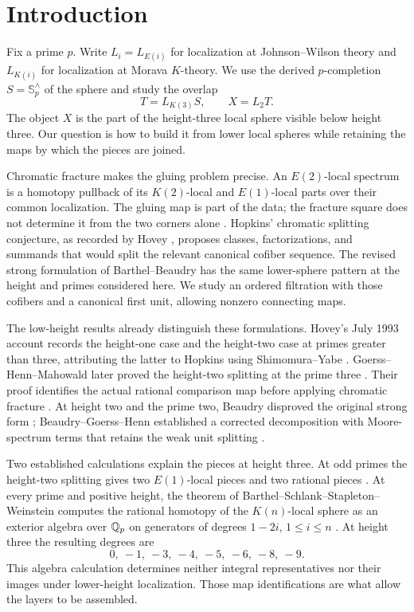 \section{Introduction}\label{sec:introduction}

Fix a prime \(p\).  Write \(L_i=L_{E(i)}\) for localization at
Johnson--Wilson theory and \(L_{K(i)}\) for localization at Morava
\(K\)-theory.  We use the derived \(p\)-completion
\(S=\mathbb S_p^\wedge\) of the sphere and study the overlap
\[
 T=L_{K(3)}S,\qquad X=L_2T.
\]
The object \(X\) is the part of the height-three local sphere visible
below height three.  Our question is how to build it from lower local
spheres while retaining the maps by which the pieces are joined.

Chromatic fracture makes the gluing problem precise.  An
\(E(2)\)-local spectrum is a homotopy pullback of its \(K(2)\)-local
and \(E(1)\)-local parts over their common localization.  The gluing
map is part of the data; the fracture square does not determine it
from the two corners alone
\cite[Section~2.4, diagram~(2.19)]{BB}.
Hopkins' chromatic splitting conjecture, as recorded by Hovey
\cite[Conjecture~4.2]{Hovey}, proposes classes, factorizations, and
summands that would split the relevant canonical cofiber sequence.
The revised strong formulation of Barthel--Beaudry
\cite[Conjecture~6.3 and Remark~6.4]{BB} has the same lower-sphere
pattern at the height and primes considered here.  We study an ordered
filtration with those cofibers and a canonical first unit, allowing
nonzero connecting maps.

The low-height results already distinguish these formulations.
Hovey's July 1993 account records the height-one case and the
height-two case at primes greater than three, attributing the latter
to Hopkins using Shimomura--Yabe \cite[pp.~17--19]{Hovey}.
Goerss--Henn--Mahowald later proved
the height-two splitting at the prime three
\cite[Theorem~1.2]{GoerssHennMahowald2014}.  Their proof identifies
the actual rational comparison map before applying chromatic fracture
\cite[proof of Theorem~5.11, p.~1288]{GoerssHennMahowald2014}.
At height two and the prime two, Beaudry disproved the original strong
form \cite[Theorem~1.4]{Beaudry2017}; Beaudry--Goerss--Henn established
a corrected decomposition with Moore-spectrum terms that retains the
weak unit splitting \cite[Theorem~1.1.6]{BGH2022}.

Two established calculations explain the pieces at height three.
At odd primes the height-two splitting gives two \(E(1)\)-local
pieces and two rational pieces
\cite[Theorem~6.7]{BB}.  At every prime and positive height, the theorem of
Barthel--Schlank--Stapleton--Weinstein computes the rational homotopy
of the \(K(n)\)-local sphere as an exterior algebra over \(\mathbb Q_p\)
on generators of degrees \(1-2i\), \(1\leq i\leq n\)
\cite[Theorem~A]{BSSW}.  At height three the resulting degrees are
\[
 0,\ -1,\ -3,\ -4,\ -5,\ -6,\ -8,\ -9.
\]
This algebra calculation determines neither integral representatives
nor their images under lower-height localization.  Those map
identifications are what allow the layers to be assembled.

